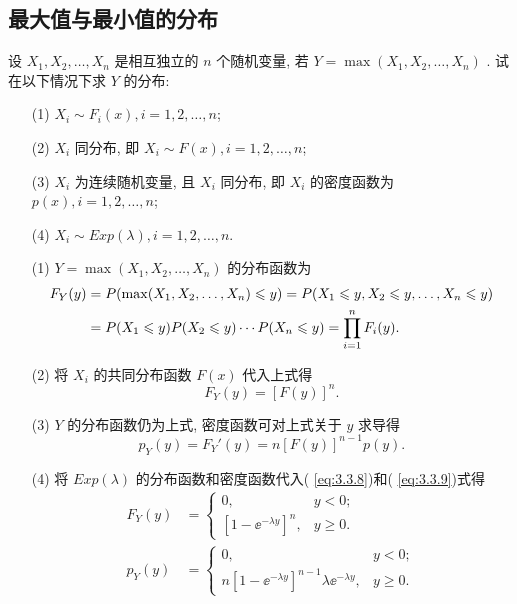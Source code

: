   \subsection{最大值与最小值的分布}\label{ssec:3.3.2}
   \begin{example}[最大值分布]\label{exam:3.3.4}
   	设 $X_1,X_2,\ldots,X_n$ 是相互独立的 $n$ 个随机变量, 若 $Y=\max(X_1,X_2,\ldots,X_n)$ . 试在以下情况下求 $Y$ 的分布:
   	\begin{itemize}
   		\item[(1)] $X_i\sim F_i(x),i=1,2,\ldots,n$;
   		\item[(2)] $X_i$ 同分布, 即 $X_i\sim F(x),i=1,2,\ldots,n$;
   		\item[(3)] $X_i$ 为连续随机变量, 且 $X_i$ 同分布, 即 $X_i$ 的密度函数为 $p(x),i=1,2,\ldots,n$;
   		\item[(4)] $X_i\sim Exp(\lambda),i=1,2,\ldots,n$.
   	\end{itemize}
   	\begin{solution}
   		\begin{itemize}
   			\item[(1)] $Y=\max(X_1,X_2,\ldots,X_n)$ 的分布函数为
   			\begin{align}
   				F_Y(y)
   				&=P(\max(X_1,X_2,\ldots,X_n)\leqslant y)=P(X_1\leqslant y,X_2\leqslant y,\ldots,X_n\leqslant y)\notag\\
   				&=P(X_1\leqslant y)P(X_2\leqslant y)\cdots P(X_n\leqslant y)=\prod_{i=1}^{n}F_i(y).\label{eq:3.3.7}
   			\end{align}
   			\item[(2)] 将 $X_i$ 的共同分布函数 $F(x)$ 代入上式得
   			\begin{equation}
   				F_Y(y)=[F(y)]^n.\label{eq:3.3.8}
   			\end{equation}
   			\item[(3)] $Y$ 的分布函数仍为上式, 密度函数可对上式关于 $y$ 求导得
   			\begin{equation}
   				p_Y(y)=F_{Y}'(y)=n[F(y)]^{n-1}p(y).\label{eq:3.3.9}
   			\end{equation}
   			\item[(4)] 将 $Exp(\lambda)$ 的分布函数和密度函数代入( \eqref{eq:3.3.8})和( \eqref{eq:3.3.9})式得
   			\begin{align*}
   				F_Y(y) &= \begin{cases}
   					0, & y<0;\\
   					[1-\ee^{-\lambda y}]^n, & y\geqslant0.
   				\end{cases}\\
   				p_Y(y) &= \begin{cases}
   					0, & y<0;\\
   					n[1-\ee^{-\lambda y}]^{n-1}\lambda\ee^{-\lambda y}, & y\geqslant0.
   				\end{cases}
   			\end{align*}
   		\end{itemize}
   	\end{solution}
   \end{example}
